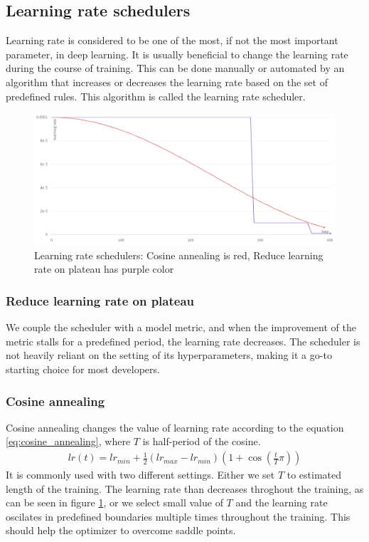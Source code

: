 \subsection{Learning rate schedulers}
Learning rate is considered to be one of the most, if not the most important parameter, in deep learning. It is usually beneficial to change the learning rate during the course of training. This can be done manually or automated by an algorithm that increases or decreases the learning rate based on the set of predefined rules. This algorithm is called the learning rate scheduler.
\begin{figure}
    \centering
    \includegraphics[width=0.5\linewidth]{images/schedulers.png}
    \caption{Learning rate schedulers: Cosine annealing is red, Reduce learning rate on plateau has purple color}
    \label{fig:schedulers}
\end{figure}

\subsubsection{Reduce learning rate on plateau}
We couple the scheduler with a model metric, and when the improvement of the metric stalls for a predefined period, the learning rate decreases.
The scheduler is not heavily reliant on the setting of its hyperparameters, making it a go-to starting choice for most developers.

\subsubsection{Cosine annealing}
Cosine annealing changes the value of learning rate according to the equation \ref{eq:cosine_annealing}, where $T$ is half-period of the cosine.
\begin{align}
    lr(t) = lr_{min} + \frac{1}{2} \left( lr_{max} - lr_{min} \right) \left( 1 + \cos \left( \frac{t}{T}\pi \right) \right)
    \label{eq:cosine_annealing}
\end{align}
It is commonly used with two different settings. Either we set $T$ to estimated length of the training. The learning rate than decreases throghout the training, as can be seen in figure \ref{fig:schedulers}, or we select small value of $T$ and the learning rate oscilates in predefined boundaries multiple times throughout the training. This should help the optimizer to overcome saddle points.

